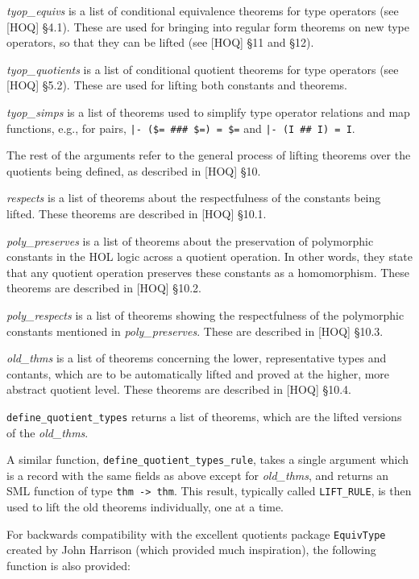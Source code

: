 {\it tyop\_equivs\/} is a list of conditional equivalence theorems
for type operators (see [HOQ] \S 4.1).
These are used for bringing into regular form
theorems on new type operators, so that they can be lifted
(see [HOQ] \S 11 and \S 12).

{\it tyop\_quotients\/} is a list of conditional quotient theorems
for type operators (see [HOQ] \S 5.2).
These are used for lifting both constants and theorems.

{\it tyop\_simps\/} is a list of theorems used to simplify type operator
relations and map functions, e.g.,
for pairs,
{\tt |- (\$= \#\#\# \$=) = \$=} and
{\tt |- (I \#\# I) = I}.

The rest of the arguments refer to the general process of lifting theorems
over the quotients being defined,
as described in [HOQ] \S 10.

{\it respects\/} is a list of theorems about the respectfulness of the
constants being lifted.
These theorems are described in
[HOQ] \S 10.1.

{\it poly\_preserves\/} is a list of theorems about the preservation of
polymorphic constants in the HOL logic
across a quotient operation.
In other words, they state that any quotient operation preserves these
constants as a homomorphism.
These theorems are described in
[HOQ] \S 10.2.

{\it poly\_respects\/} is a list of theorems showing the respectfulness
of the polymorphic constants mentioned in {\it poly\_preserves}.
These are
described in
[HOQ] \S 10.3.

{\it old\_thms\/} is a list of theorems concerning the lower, representative
types and contants, which are to be automatically lifted and proved at the
higher, more abstract quotient level.
These theorems are described in
[HOQ] \S 10.4.

{\tt define\_quotient\_types} returns a list of theorems, which are the
lifted versions of the {\it old\_thms}.

A similar function,
{\tt define\_quotient\_types\_rule}, takes a single argument which is a
record with the same fields as above except for {\it old\_thms},
and returns an SML function of type {\tt thm -> thm}.
This result, typically called {\tt LIFT\_RULE},
is then used to lift the old theorems individually, one at a time.

For backwards compatibility with
the excellent quotients package
{\tt EquivType}
created by
John Harrison
(which provided much inspiration),
the following function is also provided:

